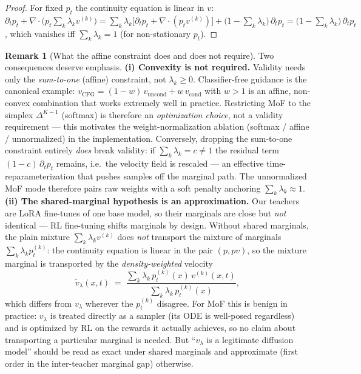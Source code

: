 \documentclass[11pt,a4paper]{article}
\theoremstyle{definition}
\newtheorem{remark}{Remark}
\begin{document}
\begin{proof}
For fixed $p_t$ the continuity equation is linear in $v$:
$\partial_t p_t + \nabla\!\cdot\big(p_t\sum_k\lambda_k v^{(k)}\big)
= \sum_k\lambda_k\big[\partial_t p_t +
\nabla\!\cdot(p_t v^{(k)})\big]
+ \big(1-\textstyle\sum_k\lambda_k\big)\,\partial_t p_t
= \big(1-\textstyle\sum_k\lambda_k\big)\,\partial_t p_t$,
which vanishes iff $\sum_k\lambda_k=1$ (for non-stationary $p_t$).
\end{proof}

\begin{remark}[What the affine constraint does and does not require]
\label{rem:affine_vs_convex}
Two consequences deserve emphasis.
\textbf{(i) Convexity is not required.} Validity needs only the
\emph{sum-to-one} (affine) constraint, not $\lambda_k\geq 0$.
Classifier-free guidance is the canonical example: $v_{\mathrm{CFG}} =
(1-w)\,v_{\mathrm{uncond}} + w\,v_{\mathrm{cond}}$ with $w>1$ is an affine,
non-convex combination that works extremely well in practice. Restricting
MoF to the simplex $\Delta^{K-1}$ (softmax) is therefore an
\emph{optimization choice}, not a validity requirement — this motivates the
weight-normalization ablation (softmax / affine / unnormalized) in the
implementation. Conversely, dropping the sum-to-one constraint entirely
\emph{does} break validity: if $\sum_k\lambda_k = c\neq 1$ the residual
term $(1-c)\,\partial_t p_t$ remains, i.e.\ the velocity field is rescaled
— an effective time-reparameterization that pushes samples off the
marginal path. The unnormalized MoF mode therefore pairs raw weights with a
soft penalty anchoring $\sum_k\lambda_k\approx 1$.
\textbf{(ii) The shared-marginal hypothesis is an approximation.} Our
teachers are LoRA fine-tunes of one base model, so their marginals are
close but \emph{not} identical — RL fine-tuning shifts marginals by design.
Without shared marginals, the plain mixture $\sum_k\lambda_k v^{(k)}$ does
\emph{not} transport the mixture of marginals $\sum_k\lambda_k p^{(k)}_t$:
the continuity equation is linear in the pair $(p, pv)$, so the mixture
marginal is transported by the \emph{density-weighted} velocity
\begin{equation}
\tilde v_\lambda(x,t)\;=\;
\frac{\sum_k \lambda_k\, p_t^{(k)}(x)\, v^{(k)}(x,t)}
     {\sum_k \lambda_k\, p_t^{(k)}(x)},
\label{eq:density_weighted}
\end{equation}
which differs from $v_\lambda$ wherever the $p^{(k)}_t$ disagree. For MoF
this is benign in practice: $v_\lambda$ is treated directly as a sampler
(its ODE is well-posed regardless) and is optimized by RL on the rewards it
actually achieves, so no claim about transporting a particular marginal is
needed. But ``$v_\lambda$ is a legitimate diffusion model'' should be read
as exact under shared marginals and approximate (first order in the
inter-teacher marginal gap) otherwise.
\end{remark}
\end{document}
